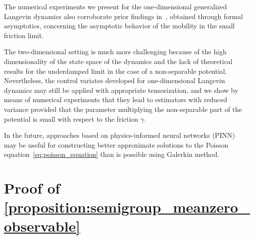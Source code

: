\documentclass[11pt,a4paper]{article}
\begin{document}
The numerical experiments we present for the one-dimensional generalized Langevin dynamics also corroborate prior findings in~\cite{GPGSUV21},
obtained through formal asymptotics,
concerning the asymptotic behavior of the mobility in the small friction limit.

The two-dimensional setting is much more challenging because of the high dimensionality of the state space of the dynamics
and the lack of theoretical results for the underdamped limit in the case of a non-separable potential.
Nevertheless, the control variates developed for one-dimensional Langevin dynamics may still be applied with appropriate tensorization,
and we show by means of numerical experiments that
they lead to estimators with reduced variance provided that
the parameter multiplying the non-separable part of the potential is small with respect to the friction $\gamma$.

In the future,
approaches based on physics-informed neural networks (PINN)~\cite{MR3881695} may be useful for constructing better approximate solutions to the Poisson equation~\eqref{eq:poisson_equation} than is possible using Galerkin method.

\appendix
\section{Proof of \texorpdfstring{\cref{proposition:semigroup_meanzero_observable}}{Proposition 2.1}}%
\label{sec:auxiliary_technical_results}
\end{document}
